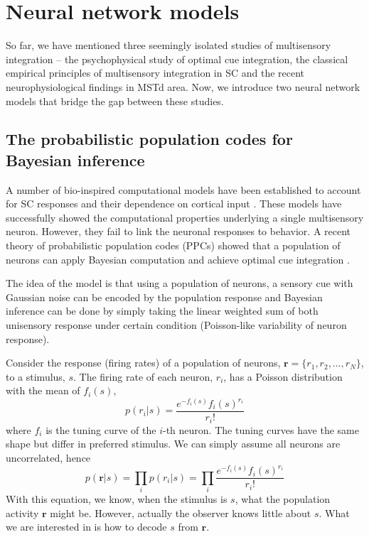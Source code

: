 \documentclass{article}[11pt]
\begin{document}

\section{Neural network models}
So far, we have mentioned three seemingly isolated studies of multisensory integration -- the psychophysical study of optimal cue integration, the classical empirical principles of multisensory integration in SC and the recent neurophysiological findings in MSTd area. Now, we introduce two neural network models that bridge the gap between these studies.

\subsection{The probabilistic population codes for Bayesian inference}
A number of bio-inspired computational models have been established to account for SC responses and their dependence on cortical input \cite{patton_modeling_2003, alvarado_neural_2008}. These models have successfully showed the computational properties underlying a single multisensory neuron. However, they fail to link the neuronal responses to behavior. A recent theory of probabilistic population codes (PPCs) showed that a population of neurons can apply Bayesian computation and achieve optimal cue integration \cite{ma_bayesian_2006}.

The idea of the model is that using a population of neurons, a sensory cue with Gaussian noise can be encoded by the population response and Bayesian inference can be done by simply taking the linear weighted sum of both unisensory response under certain condition (Poisson-like variability of neuron response).

Consider the response (firing rates) of a population of neurons, $\mathbf{r} = \{ r_1, r_2, \dots, r_N \}$, to a stimulus, $s$. The firing rate of each neuron, $r_i$, has a Poisson distribution with the mean of $f_i(s)$, 
\begin{equation}
  p(r_i|s) = \frac{e^{-f_i(s)} f_i(s)^{r_i}}{r_i!}
  \label{eq:poisson}
\end{equation}
where $f_i$ is the tuning curve of the $i$-th neuron. The tuning curves have the same shape but differ in preferred stimulus. We can simply assume all neurons are uncorrelated, hence
\begin{equation}
  p(\mathbf{r}|s) = \prod_{i} p(r_i|s) = \prod_{i} \frac{e^{-f_i(s)} f_i(s)^{r_i}}{r_i!}
  \label{eq:popvar}
\end{equation}
With this equation, we know, when the stimulus is $s$, what the population activity $\mathbf{r}$ might be. However, actually the observer knows little about $s$. What we are interested in is how to decode $s$ from $\mathbf{r}$.
\end{document}
